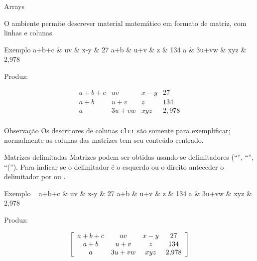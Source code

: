 \begin{frame}{Arrays}
	\fontsize{10}{11}\selectfont

	O ambiente  permite descrever material matemático em formato de matriz, com linhas e  colunas.

    \pause
	\begin{Codigo}{Exemplo}
		\n
			a+b+c \& uv    \& x-y \& 27  \LCmd{\bs}\n
			a+b   \& u+v   \& z   \& 134 \LCmd{\bs}\n
			a     \& 3u+vw \& xyz \& 2,978 \LCmd{\bs}\n
	\end{Codigo}
	
	\pause
	Produz:
	
	\begin{Resultado}{}
		\[
		\begin{array}{clcr}
			a+b+c & uv    & x-y & 27  \\
			a+b   & u+v   & z   & 134 \\
			a     & 3u+vw & xyz & 2{,}978 \\
		\end{array}
		\]
	\end{Resultado}

    \pause
	\begin{Observacao}{Observação}
		Os descritores de colunas \texttt{clcr} são somente para exemplificar; normalmente as colunas das matrizes tem seu conteúdo centrado.
	\end{Observacao}
\end{frame}

\begin{frame}{Matrizes delimitadas}
	Matrizes podem ser obtidas usando-se delimitadores (``\lb'', ``\ls'', ``(''). Para indicar se o delimitador é o esquerdo ou o direito anteceder o delimitador por  ou .

    \pause
	\begin{Codigo}{Exemplo}
		\LCmd{[} \ls\ 
		\n
			a+b+c \& uv    \& x-y \& 27  \LCmd{\bs}\n
			a+b   \& u+v   \& z   \& 134 \LCmd{\bs}\n
			a     \& 3u+vw \& xyz \& 2,978 \LCmd{\bs}\n
		\rs\ \LCmd{]}
	\end{Codigo}

    \pause
	Produz:
	
	\begin{Resultado}{}
		\[ \left [
		\begin{array}{*4c}
			a+b+c & uv    & x-y & 27  \\
			a+b   & u+v   & z   & 134 \\
			a     & 3u+vw & xyz & 2{,}978 \\
		\end{array}
		\right ] \]
	\end{Resultado}
\end{frame}


